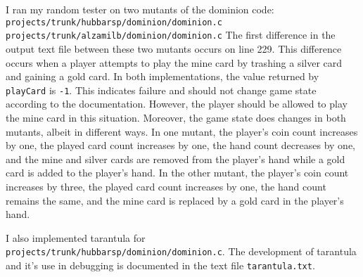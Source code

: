 \documentclass[10pt,letterpaper,notitlepage,draft]{article}
\begin{document}

I ran my random tester on two mutants of the dominion code:
\newline
\texttt{projects/trunk/hubbarsp/dominion/dominion.c}
\newline
\texttt{projects/trunk/alzamilb/dominion/dominion.c}
\newline
The first difference in the output text file between these two mutants occurs on line 229.
This difference occurs when a player attempts to play the mine card by trashing a silver card and gaining a gold card.
In both implementations, the value returned by \texttt{playCard} is \texttt{-1}.
This indicates failure and should not change game state according to the documentation.
However, the player should be allowed to play the mine card in this situation.
Moreover, the game state does changes in both mutants, albeit in different ways.
In one mutant, the player's coin count increases by one, the played card count increases by one, the hand count decreases by one, and the mine and silver cards are removed from the player's hand while a gold card is added to the player's hand.
In the other mutant, the player's coin count increases by three, the played card count increases by one, the hand count remains the same, and the mine card is replaced by a gold card in the player's hand.

I also implemented tarantula for \texttt{projects/trunk/hubbarsp/dominion/dominion.c}.
The development of tarantula and it's use in debugging is documented in the text file \texttt{tarantula.txt}.

\end{document}
